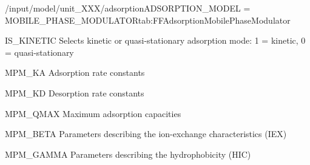 \begin{condsubgroup}{/input/model/unit\_XXX/adsorption}{ADSORPTION\_MODEL = MOBILE\_PHASE\_MODULATOR}{tab:FFAdsorptionMobilePhaseModulator}
\begin{dataset}[type=int,range={$\{ 0,1 \}$},length=1]{IS\_KINETIC}
    Selects kinetic or quasi-stationary adsorption mode: 1 = kinetic, 0 = quasi-stationary
  \end{dataset}
  \begin{dataset}[unit=\si{\cubic\metre\of{MP}\per\mol\per\second}, type=double,range={$\geq 0$},length={\texttt{NCOMP}}]{MPM\_KA}
    Adsorption rate constants
  \end{dataset}
  \begin{dataset}[unit=\si{\raiseto{3\beta}\metre\of{MP}\per\raiseto{\beta}\mol\per\second}, type=double,range={$\geq 0$},length={\texttt{NCOMP}}]{MPM\_KD}
    Desorption rate constants
  \end{dataset}
  \begin{dataset}[unit=\si{\mol\per\cubic\metre\of{SP}}, type=double,range={$\geq 0$},length={\texttt{NCOMP}}]{MPM\_QMAX}
    Maximum adsorption capacities
  \end{dataset}
  \begin{dataset}[unit=\si{\mol\per\cubic\metre\of{SP}}, type=double,range={$\geq 0$},length={\texttt{NCOMP}}]{MPM\_BETA}
    Parameters describing the ion-exchange characteristics (IEX)
  \end{dataset}
  \begin{dataset}[unit=\si{\cubic\metre\of{MP}\per\mol}, type=double,range={$\geq 0$},length={\texttt{NCOMP}}]{MPM\_GAMMA}
    Parameters describing the hydrophobicity (HIC)
  \end{dataset}
\end{condsubgroup}
  
